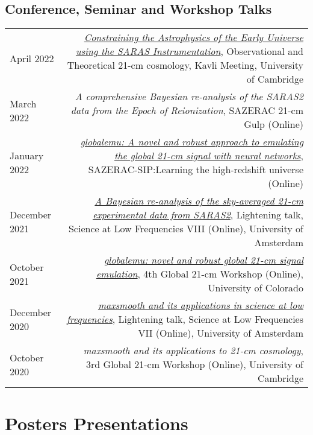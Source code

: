 \documentclass{article}
\begin{document}
\subsection*{Conference, Seminar and Workshop Talks}
\begin{tabular}{L!{\vrule}R}
	April 2022 & \href{https://www.kicc.cam.ac.uk/events/kavli-science-themed-meetings/observational-and-theoretical-21-cm-cosmology}{\textit{Constraining the Astrophysics of the Early Universe using the SARAS Instrumentation}}, Observational and Theoretical 21-cm cosmology, Kavli Meeting, University of Cambridge \\
	March 2022 & \textit{A comprehensive Bayesian re-analysis of the SARAS2 data from the Epoch of Reionization}, SAZERAC 21-cm Gulp (Online) \\
	January 2022 & \href{https://www.youtube.com/watch?v=BFwia93NuAc&list=PLp95u5tgS_YUkFaLATBQpLajJzO5ljN5u&index=5}{\textit{globalemu: A novel and robust approach to emulating the global 21-cm signal with neural networks}}, SAZERAC-SIP:Learning the high-redshift universe (Online) \\
	December 2021 & \href{https://www.youtube.com/watch?v=93KCp7rHcGA&list=PLZL7YmXBBHPDCyNfJcWwP78GgacY_Og4E&index=23}{\textit{A Bayesian re-analysis of the sky-averaged 21-cm experimental data from SARAS2}}, Lightening talk, Science at Low Frequencies VIII (Online), University of Amsterdam \\
	October 2021 & \href{https://www.youtube.com/watch?v=862NuVyF33k&list=PLF7c7ri2hrnGlwbn4JLc0PWbncSeARdTP&index=4}{\textit{globalemu: novel and robust global 21-cm signal emulation}}, 4th Global 21-cm Workshop (Online), University of Colorado \\
	December 2020 & \href{https://www.youtube.com/watch?v=Yw6_IInwTNE}{\textit{maxsmooth and its applications in science at low frequencies}}, Lightening talk, Science at Low Frequencies VII (Online), University of Amsterdam \\
	October 2020 & \textit{maxsmooth and its applications to 21-cm cosmology}, 3rd Global 21-cm Workshop (Online), University of Cambridge \\
\end{tabular}


\section*{Posters Presentations}
\end{document}
